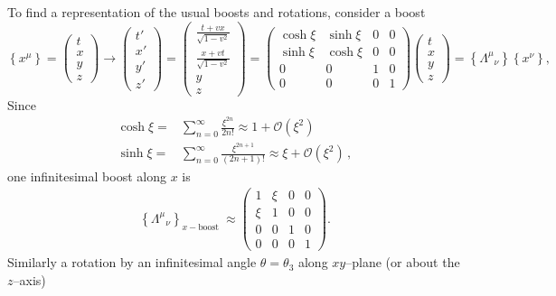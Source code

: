 To find a representation of the usual boosts and rotations, 
consider a boost
\begin{equation}
  \left\{x^\mu\right\}=\begin{pmatrix}
    t\\
    x\\
    y\\
    z
  \end{pmatrix}\to
  \begin{pmatrix}
    t'\\
    x'\\
    y'\\
    z'
  \end{pmatrix}=
  \begin{pmatrix}
    \frac{t+vx}{\sqrt{1-v^2}}\\
    \frac{x+vt}{\sqrt{1-v^2}}\\
    y\\
    z
  \end{pmatrix}=
  \begin{pmatrix}
    \cosh\xi&\sinh\xi&0&0\\
    \sinh\xi&\cosh\xi&0&0\\
    0     &  0  &1&0\\
    0     &  0  &0&1
  \end{pmatrix}
  \begin{pmatrix}
    t\\
    x\\
    y\\
    z
  \end{pmatrix}=\left\{{\Lambda^\mu}_{\nu}\right\}\left\{x^\nu\right\},
\end{equation}
Since
\begin{align}
  \cosh\xi=&\sum_{n=0}^{\infty}\frac{\xi^{2n}}{2n!}\approx 1+\mathcal{O}(\xi^2)\nonumber\\
  \sinh\xi=&\sum_{n=0}^{\infty}\frac{\xi^{2n+1}}{(2n+1)!}\approx \xi+\mathcal{O}(\xi^2)\,,
\end{align}
one infinitesimal boost along $x$ is
\begin{align}
  \left\{{\Lambda^\mu}_{\nu}\right\}_{x-\text{boost }}\approx
  \begin{pmatrix}
    1&\xi&0&0\\
    \xi&1&0&0\\
    0&0&1&0\\
    0&0&0&1
  \end{pmatrix}.
\end{align}
Similarly a rotation by an infinitesimal angle $\theta=\theta_3$ along $xy$--plane (or about the $z$--axis)
